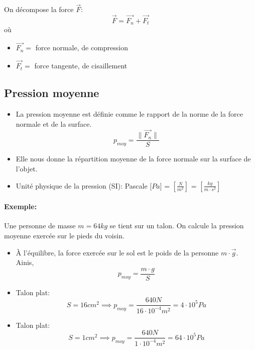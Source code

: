 \documentclass[
    11pt,
    a4paper,
    oneside,
    headinlcude, footinclude,
    twoside,
]{report}
\renewcommand{\vec}[1]{\overrightarrow{#1}}
\begin{document}
\begin{center}
    \begin{minipage}{.49\linewidth}
        \setlength{\parskip}{.3em}
        On décompose la force $\vec F$:
        \begin{equation}
            \vec F = \vec{F_{n}} + \vec{F_{t}}
        \end{equation}
        où \begin{itemize}
            \item $\vec{F_{n}}=$ force normale, de compression
            \item $\vec{F_{t}}=$ force tangente, de cisaillement
        \end{itemize}
    \end{minipage}
\end{center}

\subsection{Pression moyenne}
\label{sub:pression_moyenne}

\begin{itemize}
    \item La pression moyenne est définie comme le rapport de la norme de la
        force normale et de la surface.
        \begin{equation}
            p_{moy} = \frac{\| \vec{F_{n}}\|}{S}
        \end{equation}
    \item Elle nous donne la répartition moyenne de la force normale sur la
        surface de l'objet.
    \item Unité physique de la pression (SI): Pascale [$Pa$] = $\left[\frac{N}{m^{2}}\right]$
        = $\left[\frac{kg}{m \cdot s^{2}}\right]$
\end{itemize}

\paragraph{Exemple:}

Une personne de masse $m = 64 kg$ se tient sur un talon. On calcule la
pression moyenne exercée sur le pieds du voisin.
\begin{itemize}
    \item À l'équilibre, la force exercée sur le sol est le poids de la
        personne $m \cdot \vec g$. Ainis,
        \begin{equation}
            p_{moy} = \frac{m\cdot g}{S}
        \end{equation}
    \item Talon plat: $$S = 16 cm^{2} \implies p_{moy} = \frac{640 N }{16\cdot
        10^{-4} m^{2}} = 4 \cdot 10^{5}Pa$$
    \item Talon plat: $$S = 1 cm^{2} \implies p_{moy} = \frac{640 N }{1\cdot
        10^{-4} m^{2}} = 64 \cdot 10^{5}Pa$$
\end{itemize}
\end{document}
